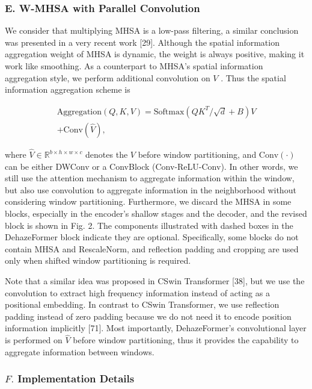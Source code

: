\subsubsection{E. W-MHSA with Parallel Convolution}

We consider that multiplying MHSA is a low-pass filtering, a similar conclusion was presented in a very recent work [29]. Although the spatial information aggregation weight of MHSA is dynamic, the weight is always positive, making it work like smoothing. As a counterpart to MHSA’s spatial information aggregation style, we perform additional convolution on $V$ . Thus the spatial information aggregation scheme is

\begin{equation}
\begin{array}{c}{\mathrm{Aggregation}(Q,K,V)=\mathrm{Softmax}\left(Q K^{T}/\sqrt{d}+B\right)V}\\ {+\mathrm{Conv}(\hat{V}),}\end{array}
\end{equation}

where $\hat{V}\in\mathbb{R}^{b\times h\times w\times c}$ denotes the $V$ before window partitioning, and $\mathrm{Conv}(\cdot)$ can be either DWConv or a ConvBlock (Conv-ReLU-Conv). In other words, we still use the attention mechanism to aggregate information within the window, but also use convolution to aggregate information in the neighborhood without considering window partitioning. Furthermore, we discard the MHSA in some blocks, especially in the encoder’s shallow stages and the decoder, and the revised block is shown in Fig. 2. The components illustrated with dashed boxes in the DehazeFormer block indicate they are optional. Specifically, some blocks do not contain MHSA and RescaleNorm, and reflection padding and cropping are used only when shifted window partitioning is required.

Note that a similar idea was proposed in CSwin Transformer [38], but we use the convolution to extract high frequency information instead of acting as a positional embedding. In contrast to CSwin Transformer, we use reflection padding instead of zero padding because we do not need it to encode position information implicitly [71]. Most importantly, DehazeFormer’s convolutional layer is performed on $\hat{V}$ before window partitioning, thus it provides the capability to aggregate information between windows.

\subsubsection{$F.$ Implementation Details}

